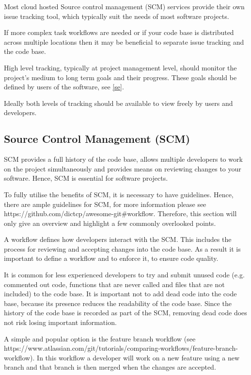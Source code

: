 \documentclass[jnr]{iosart2x}
\begin{document}
Most cloud hosted Source control management (SCM) services provide their own issue tracking tool, which typically suit the needs of most software projects.

If more complex task workflows are needed or if your code base is distributed across multiple locations then it may be beneficial to separate issue tracking and the code base.

High level tracking, typically at project management level, should monitor the project's medium to long term goals and their progress.
These goals should be defined by users of the software, see \ref{se}.

Ideally both levels of tracking should be available to view freely by users and developers.

\subsection{Source Control Management (SCM)}
\label{Source control management}

SCM provides a full history of the code base, allows multiple developers to work on the project simultaneously and provides means on reviewing changes to your software.
Hence, SCM is essential for software projects.

To fully utilise the benefits of SCM, it is necessary to have guidelines.
Hence, there are ample guidelines for SCM, for more information please see https://github.com/dictcp/awesome-git\#workflow.
Therefore, this section will only give an overview and highlight a few commonly overlooked points.

A workflow defines how developers interact with the SCM.
This includes the process for reviewing and accepting changes into the code base.
As a result it is important to define a workflow and to enforce it, to ensure code quality.

It is common for less experienced developers to try and submit unused code (e.g. commented out code, functions that are never called and files that are not included) to the code base.
It is important not to add dead code into the code base, because
its presence reduces the readability of the code base.
Since the history of the code base is recorded as part of the SCM, removing dead code does not risk losing important information.

A simple and popular option is the feature branch workflow (see https://www.atlassian.com/git/tutorials/comparing-workflows/feature-branch-workflow).
In this workflow a developer will work on a new feature using a new branch and that branch is then merged when the changes are accepted.
\end{document}
